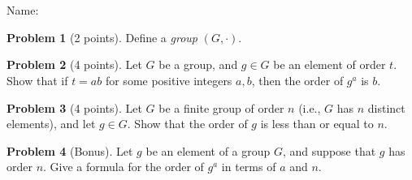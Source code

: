 \documentclass[11pt]{article}
\title{}
\date{\vspace{-0.5in}}
\theoremstyle{definition}
\newtheorem{problem}{Problem}
\begin{document}
\thispagestyle{fancy}
\pagestyle{fancy}

\noindent
\section*{}


\vspace{-2em}
{\LARGE Name:} 

\vspace{2em}


\setcounter{problem}{0}

\begin{problem}[2 points]
	Define a \emph{group} $(G, \cdot)$.
\end{problem}

 \vfill


\begin{problem}[4 points]
	Let $G$ be a group, and $g\in G$ be an element of order $t$. Show that if $t=ab$ for some positive integers $a,b$, then the order of $g^a$ is $b$.
\end{problem}

\vfill

\vfill

\begin{problem}[4 points]
	Let $G$ be a finite group of order $n$ (i.e., $G$ has $n$ distinct elements), and let $g\in G$. Show that the order of $g$ is less than or equal to $n$.\end{problem}

\vfill

\vfill

\newpage

\begin{problem}[Bonus]
	Let $g$ be an element of a group $G$, and suppose that $g$ has order $n$. Give a formula for the order of $g^a$ in terms of $a$ and $n$.	
	\vfill
\end{problem}
\end{document}
